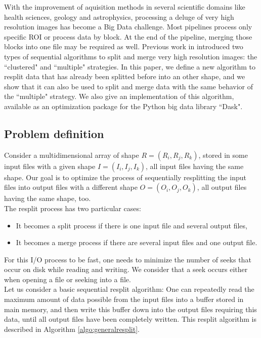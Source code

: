\documentclass[conference]{IEEEtran}
\begin{document}
With the improvement of aquisition methods in several scientific domains like health sciences, geology and astrophysics, processing a deluge of very high resolution images has become a Big Data challenge. Most pipelines process only specific ROI or process data by block. At the end of the pipeline, merging those blocks into one file may be required as well. Previous work in \cite{seqalgorithms} introduced two types of sequential algorithms to split and merge very high resolution images: the ``clustered" and ``multiple" strategies. In this paper, we define a new algorithm to resplit data that has already been splitted before into an other shape, and we show that it can also be used to split and merge data with the same behavior of the ``multiple" strategy. We also give an implementation of this algorithm, available as an optimization package for the Python big data library ``Dask".

\subsection{Problem definition}

Consider a multidimensional array of shape $R = (R_i, R_j, R_k)$, stored in some input files with a given shape $I = (I_i, I_j, I_k)$, all input files having the same shape.
Our goal is to optimize the process of sequentially resplitting the input files into output files with a different shape $O = (O_i, O_j, O_k)$, all output files having the same shape, too. \\

The resplit process has two particular cases:
\begin{itemize}
  \item It becomes a split process if there is one input file and several output files,
  \item It becomes a merge process if there are several input files and one output file.
\end{itemize}

For this I/O process to be fast, one needs to minimize the number of seeks that occur on disk while reading and writing.
We consider that a seek occurs either when opening a file or seeking into a file. \\

Let us consider a basic sequential resplit algorithm: One can repeatedly read the maximum amount of data possible from the input files into a buffer stored in main memory, and then write this buffer down into the output files requiring this data, until all output files have been completely written.
This resplit algorithm is described in Algorithm \ref{algo:generalresplit}. \\
\end{document}
